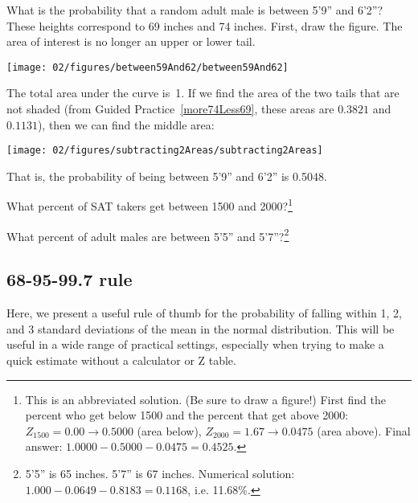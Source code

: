 \begin{example}{What is the probability that a random adult male is between 5'9'' and 6'2''?}
These heights correspond to 69 inches and 74 inches. First, draw the figure. The area of interest is no longer an upper or lower tail.\vspace{-3mm}
\begin{center}
\texttt{[image: 02/figures/between59And62/between59And62]}\vspace{-1mm}
\end{center}
The total area under the curve is~1. If we find the area of the two tails that are not shaded (from Guided Practice~\ref{more74Less69}, these areas are $0.3821$ and $0.1131$), then we can find the middle area:\vspace{-3mm}
\begin{center}
\texttt{[image: 02/figures/subtracting2Areas/subtracting2Areas]}\vspace{-1mm}
\end{center}
That is, the probability of being between 5'9'' and 6'2'' is 0.5048.
\end{example}

\begin{exercise}
What percent of SAT takers get between 1500 and 2000?\footnote{This is an abbreviated solution. (Be sure to draw a figure!) First find the percent who get below 1500 and the percent that get above 2000: $Z_{1500} = 0.00 \to 0.5000$ (area below), $Z_{2000} = 1.67 \to 0.0475$ (area above). Final answer: $1.0000-0.5000 - 0.0475 = 0.4525$.}
\end{exercise}

\begin{exercise}
What percent of adult males are between 5'5'' and 5'7''?\footnote{5'5'' is 65 inches. 5'7'' is 67 inches. Numerical solution: $1.000 - 0.0649 - 0.8183 = 0.1168$, i.e. 11.68\%.}
\end{exercise}


\subsection{68-95-99.7 rule}

Here, we present a useful rule of thumb for the probability of falling within 1, 2, and 3 standard deviations of the mean in the normal distribution. This will be useful in a wide range of practical settings, especially when trying to make a quick estimate without a calculator or Z table.

